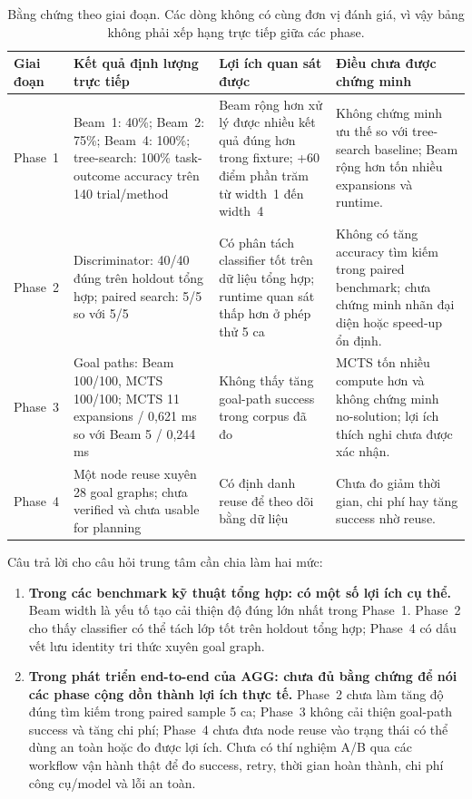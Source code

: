 \documentclass[11pt,a4paper]{article}
\begin{document}
\begin{table}[htbp]
\centering\small
\begin{tabularx}{\linewidth}{p{1.4cm} p{3.35cm} p{3.0cm} Y}
\toprule
\textbf{Giai đoạn} & \textbf{Kết quả định lượng trực tiếp} & \textbf{Lợi ích quan sát được} & \textbf{Điều chưa được chứng minh}\\
\midrule
Phase~1 & Beam~1: 40\%; Beam~2: 75\%; Beam~4: 100\%; tree-search: 100\% task-outcome accuracy trên 140 trial/method & Beam rộng hơn xử lý được nhiều kết quả đúng hơn trong fixture; +60 điểm phần trăm từ width~1 đến width~4 & Không chứng minh ưu thế so với tree-search baseline; Beam rộng hơn tốn nhiều expansions và runtime.\\
Phase~2 & Discriminator: 40/40 đúng trên holdout tổng hợp; paired search: 5/5 so với 5/5 & Có phân tách classifier tốt trên dữ liệu tổng hợp; runtime quan sát thấp hơn ở phép thử 5 ca & Không có tăng accuracy tìm kiếm trong paired benchmark; chưa chứng minh nhãn đại diện hoặc speed-up ổn định.\\
Phase~3 & Goal paths: Beam 100/100, MCTS 100/100; MCTS 11 expansions / 0,621 ms so với Beam 5 / 0,244 ms & Không thấy tăng goal-path success trong corpus đã đo & MCTS tốn nhiều compute hơn và không chứng minh no-solution; lợi ích thích nghi chưa được xác nhận.\\
Phase~4 & Một node reuse xuyên 28 goal graphs; chưa verified và chưa usable for planning & Có định danh reuse để theo dõi bằng dữ liệu & Chưa đo giảm thời gian, chi phí hay tăng success nhờ reuse.\\
\bottomrule
\end{tabularx}
\caption{Bằng chứng theo giai đoạn. Các dòng không có cùng đơn vị đánh giá, vì vậy bảng không phải xếp hạng trực tiếp giữa các phase.}
\label{tab:phasesynthesis}
\end{table}

Câu trả lời cho câu hỏi trung tâm cần chia làm hai mức:
\begin{enumerate}
\item \textbf{Trong các benchmark kỹ thuật tổng hợp: có một số lợi ích cụ thể.} Beam width là yếu tố tạo cải thiện độ đúng lớn nhất trong Phase~1. Phase~2 cho thấy classifier có thể tách lớp tốt trên holdout tổng hợp; Phase~4 có dấu vết lưu identity tri thức xuyên goal graph.
\item \textbf{Trong phát triển end-to-end của AGG: chưa đủ bằng chứng để nói các phase cộng dồn thành lợi ích thực tế.} Phase~2 chưa làm tăng độ đúng tìm kiếm trong paired sample 5 ca; Phase~3 không cải thiện goal-path success và tăng chi phí; Phase~4 chưa đưa node reuse vào trạng thái có thể dùng an toàn hoặc đo được lợi ích. Chưa có thí nghiệm A/B qua các workflow vận hành thật để đo success, retry, thời gian hoàn thành, chi phí công cụ/model và lỗi an toàn.
\end{enumerate}
\end{document}
